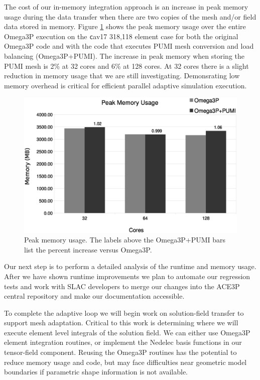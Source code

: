 \documentclass[a4paper]{article}
\begin{document}
The cost of our in-memory integration approach is an increase in peak memory
usage during the data transfer when there are two copies of the mesh and/or
field data stored in memory.
Figure \ref{fig:memusage} shows the peak memory usage over the entire Omega3P
execution on the {\texttt cav17} 318,118 element case for both the original
Omega3P code and with the code that executes PUMI mesh conversion and load
balancing (Omega3P+PUMI).
The increase in peak memory when storing the PUMI mesh is 2\% at 32 cores and
6\% at 128 cores.
At 32 cores there is a slight reduction in memory usage that we are still
investigating.
Demonsrating low memory overhead is critical for efficient parallel adaptive
simulation execution.

\begin{figure}[ht]
\centering
  \includegraphics[width=\textwidth]{peak-memory-usage.eps}
  \caption{\label{fig:memusage} Peak memory usage. The labels above the Omega3P+PUMI bars
  list the percent increase versus Omega3P.}
\end{figure}

Our next step is to perform a detailed analysis of the runtime and memory
usage.
After we have shown runtime improvements we plan to automate our regression
tests and work with SLAC developers to merge our changes into
the ACE3P central repository and make our documentation accessible.

To complete the adaptive loop we will begin work on solution-field transfer to
support mesh adaptation.
Critical to this work is determining where we will execute element level
integrals of the solution field.
We can either use Omega3P element integration routines, or implement the Nedelec
basis functions in our tensor-field component.
Reusing the Omega3P routines has the potential to reduce memory usage and code,
but may face difficulties near geometric model boundaries if parametric shape
information is not available.

\newpage 

\end{document}
